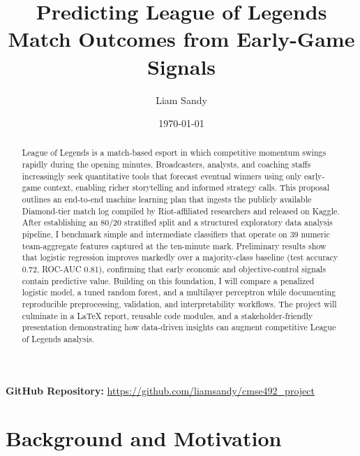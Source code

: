 \documentclass[aps,prl,preprint,groupedaddress]{revtex4-2}
\begin{document}
\title{Predicting League of Legends Match Outcomes from Early-Game Signals}

\author{Liam Sandy}

\date{\today}

\begin{abstract}
League of Legends is a match-based esport in which competitive momentum swings rapidly during the opening minutes. Broadcasters, analysts, and coaching staffs increasingly seek quantitative tools that forecast eventual winners using only early-game context, enabling richer storytelling and informed strategy calls. This proposal outlines an end-to-end machine learning plan that ingests the publicly available Diamond-tier match log compiled by Riot-affiliated researchers and released on Kaggle. After establishing an 80/20 stratified split and a structured exploratory data analysis pipeline, I benchmark simple and intermediate classifiers that operate on 39 numeric team-aggregate features captured at the ten-minute mark. Preliminary results show that logistic regression improves markedly over a majority-class baseline (test accuracy 0.72, ROC-AUC 0.81), confirming that early economic and objective-control signals contain predictive value. Building on this foundation, I will compare a penalized logistic model, a tuned random forest, and a multilayer perceptron while documenting reproducible preprocessing, validation, and interpretability workflows. The project will culminate in a LaTeX report, reusable code modules, and a stakeholder-friendly presentation demonstrating how data-driven insights can augment competitive League of Legends analysis.
\end{abstract}

\maketitle

\noindent\textbf{GitHub Repository:} \url{https://github.com/liamsandy/cmse492_project}

\section{Background and Motivation}
\label{sec:background}
\end{document}

